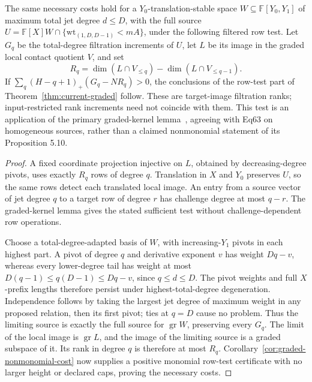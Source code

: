 \begin{corollary}\label{cor:filtered-nonmonomial-cost}
The same necessary costs hold for a $Y_0$-translation-stable space
$W\subseteq\mathbb F[Y_0,Y_1]$ of maximum total jet degree $d\le D$,
with the full source $U=\mathbb F[X]W\cap\{\mathrm{wt}_{(1,D,D-1)}<mA\}$,
under the following filtered row test. Let $G_q$ be the total-degree
filtration increments of $U$, let $L$ be its image in the graded local
contact quotient $V$, and set
\[
 R_q=\dim(L\cap V_{\le q})-\dim(L\cap V_{\le q-1}).
\]
If $\sum_q(H-q+1)_+(G_q-NR_q)>0$, the conclusions of the row-test
part of Theorem~\ref{thm:current-graded} follow. These are target-image
filtration ranks; input-restricted rank increments need not coincide
with them. This test is an application of the primary graded-kernel
lemma~\cite[Lemma 3.12]{DKTcurrent}, agreeing with Eq63 on homogeneous
sources, rather than a claimed nonmonomial statement of its Proposition 5.10.
\end{corollary}
\begin{proof}
A fixed coordinate projection injective on $L$, obtained by decreasing-degree
pivots, uses exactly $R_q$ rows of degree $q$. Translation in $X$ and $Y_0$
preserves $U$, so the same rows detect each translated local image.
An entry from a source vector of jet degree $q$ to a target row of degree
$r$ has challenge degree at most $q-r$. The graded-kernel lemma gives
the stated sufficient test without challenge-dependent row operations.

Choose a total-degree-adapted basis of $W$, with increasing-$Y_1$
pivots in each highest part. A pivot of degree $q$ and derivative
exponent $v$ has weight $Dq-v$, whereas every lower-degree tail has weight
at most $D(q-1)\le q(D-1)\le Dq-v$, since $q\le d\le D$.
The pivot weights and full $X$-prefix lengths therefore persist under
highest-total-degree degeneration. Independence follows by taking the
largest jet degree of maximum weight in any proposed relation, then its
first pivot; ties at $q=D$ cause no problem. Thus the limiting source is
exactly the full source for $\operatorname{gr}W$, preserving every $G_q$.
The limit of the local image is $\operatorname{gr}L$, and the image of the
limiting source is a graded subspace of it. Its rank in degree $q$ is
therefore at most $R_q$. Corollary~\ref{cor:graded-nonmonomial-cost}
now supplies a positive monomial row-test certificate with no larger
height or declared caps, proving the necessary costs.
\end{proof}

